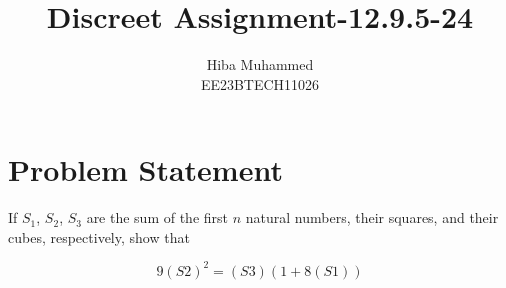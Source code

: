 \documentclass[12pt]{article}
\begin{document}
\title{Discreet Assignment-12.9.5-24}
\author{Hiba Muhammed \\
        EE23BTECH11026}
\maketitle

\section*{Problem Statement}
If \(S_1\), \(S_2\), \(S_3\) are the sum of the first \(n\) natural numbers, their squares, and their cubes, respectively, show that 

\[ 9(S\scriptstyle 2)^2 = (S\scriptstyle 3)(1 + 8(S\scriptstyle 1)) \]
\end{document}
